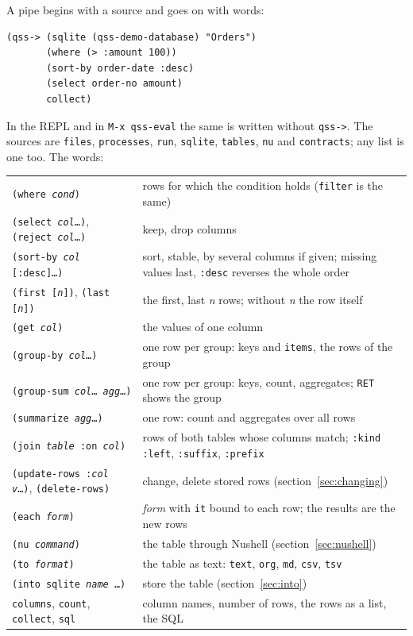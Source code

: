 \documentclass[
  paper=a4, fontsize=11pt, parskip=half, headings=small,
  toc=bibliography, numbers=noenddot, DIV=12
]{scrreprt}
\newcommand{\code}[1]{\texttt{#1}}
\newcommand{\kbd}[1]{\texttt{#1}}
\begin{document}
A pipe begins with a source and goes on with words:

\begin{lstlisting}
(qss-> (sqlite (qss-demo-database) "Orders")
       (where (> :amount 100))
       (sort-by order-date :desc)
       (select order-no amount)
       collect)
\end{lstlisting}

In the REPL and in \kbd{M-x qss-eval} the same is written without \code{qss->}.
The sources are \code{files}, \code{processes}, \code{run}, \code{sqlite},
\code{tables}, \code{nu} and \code{contracts}; any list is one too. The words:

\noindent\begin{tabularx}{\linewidth}{@{}lX@{}}
\toprule
\code{(where \emph{cond})} & rows for which the condition holds (\code{filter} is the same) \\
\code{(select \emph{col}\ldots)}, \code{(reject \emph{col}\ldots)} & keep, drop columns \\
\code{(sort-by \emph{col} [:desc]\ldots)} & sort, stable, by several columns if given; missing values last, \code{:desc} reverses the whole order \\
\code{(first [\emph{n}])}, \code{(last [\emph{n}])} & the first, last \emph{n} rows; without \emph{n} the row itself \\
\code{(get \emph{col})} & the values of one column \\
\code{(group-by \emph{col}\ldots)} & one row per group: keys and \code{items}, the rows of the group \\
\code{(group-sum \emph{col}\ldots{} \emph{agg}\ldots)} & one row per group: keys, count, aggregates; \kbd{RET} shows the group \\
\code{(summarize \emph{agg}\ldots)} & one row: count and aggregates over all rows \\
\code{(join \emph{table} :on \emph{col})} & rows of both tables whose columns match; \code{:kind :left}, \code{:suffix}, \code{:prefix} \\
\code{(update-rows :\emph{col} \emph{v}\ldots)}, \code{(delete-rows)} & change, delete stored rows (section~\ref{sec:changing}) \\
\code{(each \emph{form})} & \emph{form} with \code{it} bound to each row; the results are the new rows \\
\code{(nu \emph{command})} & the table through Nushell (section~\ref{sec:nushell}) \\
\code{(to \emph{format})} & the table as text: \code{text}, \code{org}, \code{md}, \code{csv}, \code{tsv} \\
\code{(into sqlite \emph{name} \ldots)} & store the table (section~\ref{sec:into}) \\
\code{columns}, \code{count}, \code{collect}, \code{sql} & column names, number of rows, the rows as a list, the SQL \\
\bottomrule
\end{tabularx}
\end{document}
